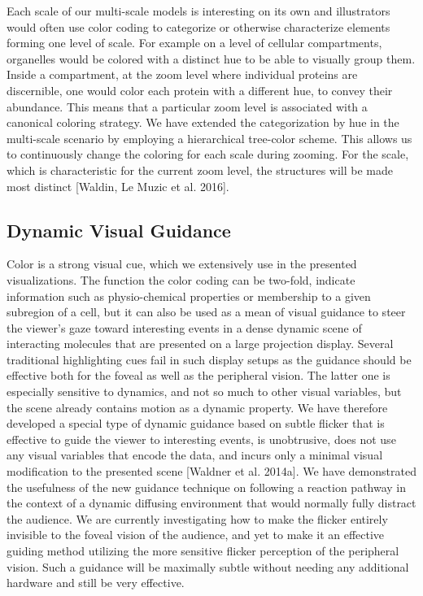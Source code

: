 Each scale of our multi-scale models is interesting on its own and illustrators would often use color coding to categorize or otherwise characterize elements forming one level of scale. For example on a level of cellular compartments, organelles would be colored with a distinct hue to be able to visually group them. Inside a compartment, at the zoom level where individual proteins are discernible, one would color each protein with a different hue, to convey their abundance. This means that a particular zoom level is associated with a canonical coloring strategy. We have extended the categorization by hue in the multi-scale scenario by employing a hierarchical tree-color scheme. This allows us to continuously change the coloring for each scale during zooming. For the scale, which is characteristic for the current zoom level, the structures will be made most distinct [Waldin, Le Muzic et al. 2016].


\subsection{Dynamic Visual Guidance}

Color is a strong visual cue, which we extensively use in the presented visualizations.
The function the color coding can be two-fold, indicate information such as physio-chemical properties or membership to a given subregion of a cell, but it can also be used as a mean of visual guidance to steer the viewer's gaze toward interesting events in a dense dynamic scene of interacting molecules that are presented on a large projection display. 
Several traditional highlighting cues fail in such display setups as the guidance should be effective both for the foveal as well as the peripheral vision. 
The latter one is especially sensitive to dynamics, and not so much to other visual variables, but the scene already contains motion as a dynamic property. 
We have therefore developed a special type of dynamic guidance based on subtle flicker that is effective to guide the viewer to interesting events, is unobtrusive, does not use any visual variables that encode the data, and incurs only a minimal visual modification to the presented scene [Waldner et al. 2014a].
We have demonstrated the usefulness of the new guidance technique on following a reaction pathway in the context of a dynamic diffusing environment that would normally fully distract the audience.  
We are currently investigating how to make the flicker entirely invisible to the foveal vision of the audience, and yet to make it an effective guiding method utilizing the more sensitive flicker perception of the peripheral vision. Such a guidance will be maximally subtle without needing any additional hardware and still be very effective.



